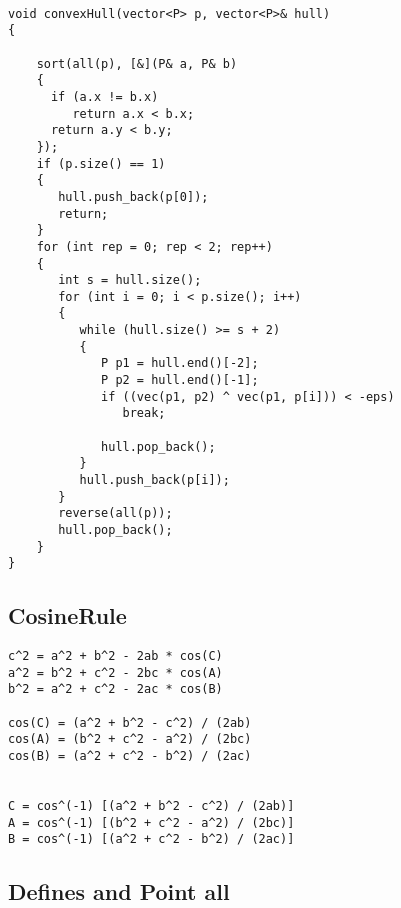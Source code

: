 \begin{lstlisting}[style=cpp]
  
void convexHull(vector<P> p, vector<P>& hull)  
{  
  
    sort(all(p), [&](P& a, P& b)  
    {  
      if (a.x != b.x)  
         return a.x < b.x;  
      return a.y < b.y;  
    });  
    if (p.size() == 1)  
    {  
       hull.push_back(p[0]);  
       return;  
    }  
    for (int rep = 0; rep < 2; rep++)  
    {  
       int s = hull.size();  
       for (int i = 0; i < p.size(); i++)  
       {  
          while (hull.size() >= s + 2)  
          {  
             P p1 = hull.end()[-2];  
             P p2 = hull.end()[-1];  
             if ((vec(p1, p2) ^ vec(p1, p[i])) < -eps)  
                break;  
  
             hull.pop_back();  
          }  
          hull.push_back(p[i]);  
       }  
       reverse(all(p));  
       hull.pop_back();  
    }  
}
\end{lstlisting}

\subsection{CosineRule}

\begin{lstlisting}[style=cpp]
c^2 = a^2 + b^2 - 2ab * cos(C) 
a^2 = b^2 + c^2 - 2bc * cos(A) 
b^2 = a^2 + c^2 - 2ac * cos(B)

cos(C) = (a^2 + b^2 - c^2) / (2ab) 
cos(A) = (b^2 + c^2 - a^2) / (2bc) 
cos(B) = (a^2 + c^2 - b^2) / (2ac)


C = cos^(-1) [(a^2 + b^2 - c^2) / (2ab)] 
A = cos^(-1) [(b^2 + c^2 - a^2) / (2bc)] 
B = cos^(-1) [(a^2 + c^2 - b^2) / (2ac)]
\end{lstlisting}

\subsection{Defines and Point all}

